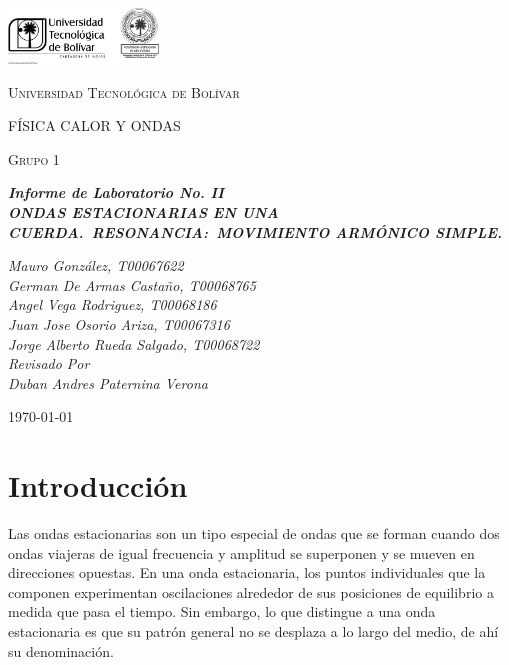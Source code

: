 \documentclass[twocolumn, 12pt]{article}
\begin{document}
\begin{titlepage}
    \centering
    \includegraphics[width=0.3\textwidth]{Images/logo_utb.png}\par\vspace{1cm}
    {\scshape\LARGE Universidad Tecnológica de Bolívar \par}
    \vspace{1cm}

    {\scshape\Large FÍSICA CALOR Y ONDAS \par}
    \vspace{.2cm}

    {\scshape\Large Grupo 1 \par}
    \vspace{1cm}
    \slshape {\Large \bfseries{}Informe de Laboratorio No. II\\}
    \slshape {\small \bfseries{} ONDAS ESTACIONARIAS EN UNA CUERDA.~RESONANCIA:\@{}~MOVIMIENTO ARMÓNICO SIMPLE.}
    \vspace{2cm}

    \slshape {\itshape{} Mauro González, T00067622 \\}
    \slshape {\itshape{} German De Armas Castaño, T00068765 \\}
    \slshape {\itshape{} Angel Vega Rodriguez, T00068186 \\}
    \slshape {\itshape{} Juan Jose Osorio Ariza, T00067316 \\}
    \slshape {\itshape{} Jorge Alberto Rueda Salgado, T00068722 \\}
    \vfill
    Revisado Por \\
    Duban Andres Paternina Verona\\
    {\large \today\par}
\end{titlepage}


\section{Introducción}

Las ondas estacionarias son un tipo especial de ondas que
se forman cuando dos ondas viajeras de igual frecuencia y
amplitud se superponen y se mueven en direcciones opuestas.
En una onda estacionaria, los puntos individuales que la
componen experimentan oscilaciones alrededor de sus
posiciones de equilibrio a medida que pasa el tiempo. Sin
embargo, lo que distingue a una onda estacionaria es que su
patrón general no se desplaza a lo largo del medio, de ahí
su denominación.
\end{document}
